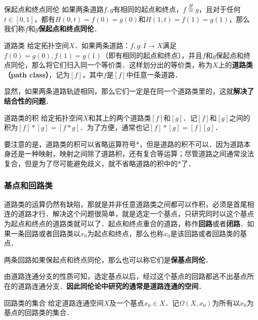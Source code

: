 \begin{definition}{保起点和终点同伦}
如果两条道路$f, g$有相同的起点和终点，$f\overset{H}{\cong}g$，且对于任何$t\in [0, 1]$，都有$H(0, t)=f(0)=g(0)$和$H(1, t)=f(1)=g(1)$，那么我们称$f$和$g$\textbf{保起点和终点同伦}．
\end{definition}

\begin{definition}{道路类}
给定拓扑空间$X$．如果两条道路：$f, g:I\rightarrow X$满足$f(0)=g(0), f(1)=g(1)$（即有相同的起点和终点），并且$f$和$g$保起点和终点同伦，那么将它们归入同一个等价类．这样划分出的等价类，称为$X$上的\textbf{道路类（path class）}，记为$[f]$，其中$f$是$[f]$中任意一条道路．
\end{definition}

显然，如果两条道路轨迹相同，那么它们一定是在同一个道路类里的，这就\textbf{解决了结合性的问题}．

\begin{definition}{道路类的积}
给定拓扑空间$X$和其上的两个道路类$[f]$和$[g]$．记$[f]$和$[g]$之间的积为$[f]*[g]=[f*g]$．为了方便，通常也记$[f]*[g]=[f][g]$．
\end{definition}

要注意的是，道路类的积可以省略运算符号$*$，但是道路的积不可以．因为道路本身还是一种映射，映射之间除了道路积，还有复合等运算；尽管道路之间通常没法复合，但是为了尽可能避免歧义，就不省略道路的积中的$*$了．

\subsubsection{基点和回路类}

道路类的运算仍然有缺陷，那就是并非任意道路类之间都可以作积，必须是首尾相连的道路才行．解决这个问题很简单，就是选定一个基点，只研究同时以这个基点为起点和终点的道路类就可以了．起点和终点重合的道路，称作\textbf{回路}或者\textbf{闭路}．如果一条回路或者回路类以$x_0$为起点和终点，那么也称$x_0$是该回路或者回路类的基点．

两条回路如果保起点和终点同伦，那么也可以称它们是\textbf{保基点同伦}．

由道路连通分支的性质可知，选定基点以后，经过这个基点的回路都逃不出基点所在的道路连通分支．\textbf{因此同伦论中研究的通常是道路连通的空间}．

\begin{definition}{回路类的集合}
给定道路连通空间$X$及一个基点$x_0\in X$．记$\Omega(X, x_0)$为所有以$x_0$为基点的回路类的集合．
\end{definition}

